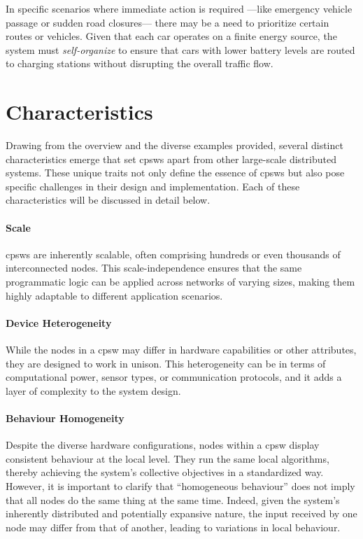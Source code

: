 In specific scenarios where immediate action is required
 ---like emergency vehicle passage or sudden road closures---
 there may be a need to prioritize certain routes or vehicles. 
 Given that each car operates on a finite energy source, the system must \emph{self-organize} to ensure that cars with lower battery levels are routed to charging stations without disrupting the overall traffic flow.

\section{Characteristics}
Drawing from the overview and the diverse examples provided, 
 several distinct characteristics emerge that set \acp{cpsw} apart from other large-scale distributed systems. 
% 
These unique traits not only define the essence of \acp{cpsw} but also pose specific challenges in their design and implementation. 
 Each of these characteristics will be discussed in detail below.

\paragraph*{Scale}
\acp{cpsw} are inherently scalable, 
 often comprising hundreds or even thousands of interconnected nodes. This scale-independence ensures that the same programmatic logic can be applied across networks of varying sizes, 
 making them highly adaptable to different application scenarios.

\paragraph*{Device Heterogeneity}
While the nodes in a \ac{cpsw} may differ in hardware capabilities or other attributes, they are designed to work in unison. 
This heterogeneity can be in terms of computational power, 
sensor types, or communication protocols, and it adds a layer of complexity to the system design.

\paragraph*{Behaviour Homogeneity}
Despite the diverse hardware configurations, 
 nodes within a \ac{cpsw} display consistent behaviour at the local level.
 They run the same local algorithms, thereby achieving the system's collective objectives in a standardized way. 
 However, it is important to clarify that ``homogeneous behaviour'' does not imply that all nodes do the same thing at the same time.
 Indeed, given the system's inherently distributed and potentially expansive nature, 
 the input received by one node may differ from that of another, 
 leading to variations in local behaviour.

